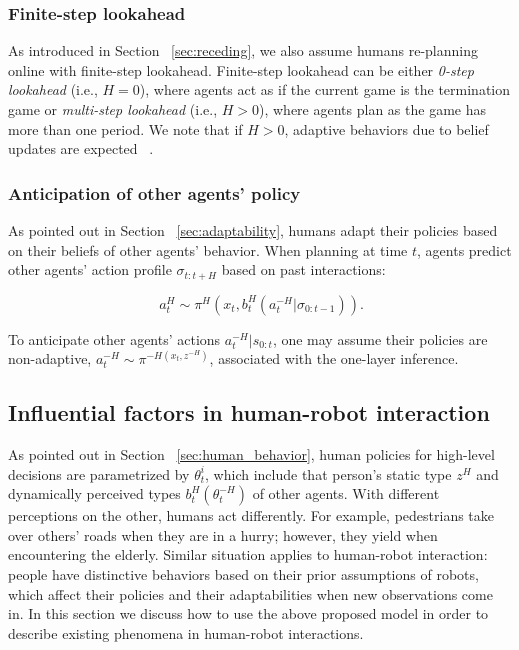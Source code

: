 \documentclass[letterpaper, 10 pt, conference]{ieeeconf}  %
\begin{document}
\subsubsection{Finite-step lookahead}
As introduced in Section ~\ref{sec:receding}, we also assume humans re-planning online with finite-step lookahead. Finite-step lookahead can be either \textit{0-step lookahead} (i.e., $H=0$), where agents act as if the current game is the termination game or \textit{multi-step lookahead} (i.e., $H>0$), where agents plan as the game has more than one period. We note that if $H>0$, adaptive behaviors due to belief updates are expected ~\cite{nikolaidis2016formalizing}.

\subsubsection{Anticipation of other agents' policy}
As pointed out in Section ~\ref{sec:adaptability}, humans adapt their policies based on their beliefs of other agents' behavior. When planning at time $t$, agents predict other agents' action profile $\sigma_{t:t+H}$ based on past interactions:

\begin{equation}~\label{eq:human_decision1}
a^H_t \sim \pi^H(x_t, b^H_t(a^{-H}_{t}|\sigma_{0:t-1})).
\end{equation}

To anticipate other agents' actions $a^{-H}_{t}|s_{0:t}$, one may assume 
their policies are non-adaptive, $a^{-H}_t \sim \pi^{-H(x_t,z^{-H})}$, 
associated with the one-layer inference. 

\color{black}\subsection{Influential factors in human-robot interaction}
As pointed out in Section ~\ref{sec:human_behavior}, human policies for high-level decisions are parametrized by $\theta^i_t$, which include that person's static type $z^H$ and dynamically perceived types $b^H_t(\theta^{-H}_t)$ of other agents. With different perceptions on the other, humans act differently. For example, pedestrians take over others' roads when they are in a hurry; however, they yield when encountering the elderly. Similar situation 
applies to human-robot interaction: people have distinctive behaviors based on their prior assumptions of robots, which affect their policies and their adaptabilities when new observations come in. In this section we discuss how to use the above proposed model in order to describe	 existing phenomena in human-robot interactions. 
\end{document}
